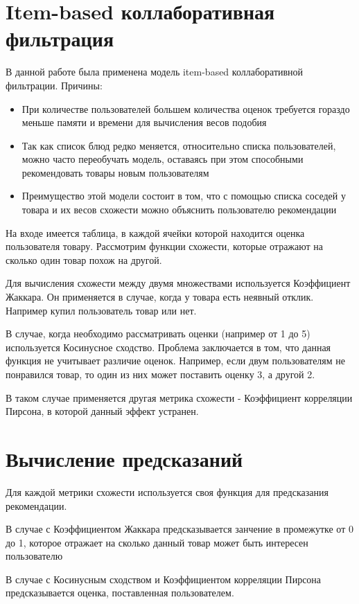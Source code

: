 \documentclass{fefu}
\begin{document}
  \section{Item-based коллаборативная фильтрация}
  В данной работе была применена модель item-based коллаборативной фильтрации.
  Причины:
  \begin{itemize}
    \item При количестве пользователей большем количества оценок требуется гораздо
    меньше памяти и времени для вычисления весов подобия
    \item Так как список блюд редко меняется, относительно списка пользователей,
    можно часто переобучать модель, оставаясь при этом способными
    рекомендовать товары новым пользователям
    \item Преимущество этой модели состоит в том, что с помощью списка соседей у
    товара и их весов схожести можно объяснить пользователю рекомендации
  \end{itemize}

  На входе имеется таблица, в каждой ячейки которой находится оценка пользователя товару.
  Рассмотрим функции схожести, которые отражают на сколько один товар похож на другой.

  Для вычисления схожести между двумя множествами используется Коэффициент Жаккара.
  Он применяется в случае, когда у товара есть неявный отклик. Например купил
  пользователь товар или нет.

  В случае, когда необходимо рассматривать оценки (например от 1 до 5) используется
  Косинусное сходство. Проблема заключается в том, что данная функция не учитывает
  различие оценок. Например, если двум пользователям не понравился товар, то один
  из них может поставить оценку 3, а другой 2.

  В таком случае применяется другая метрика схожести - Коэффициент корреляции
  Пирсона, в которой данный эффект устранен.

  \section{Вычисление предсказаний}
  Для каждой метрики схожести используется своя функция для предсказания рекомендации.

  В случае с Коэффициентом Жаккара предсказывается занчение в промежутке от 0 до 1,
  которое отражает на сколько данный товар может быть интересен пользователю

  В случае с Косинусным сходством и Коэффициентом корреляции Пирсона предсказывается
  оценка, поставленная пользователем.
\end{document}
